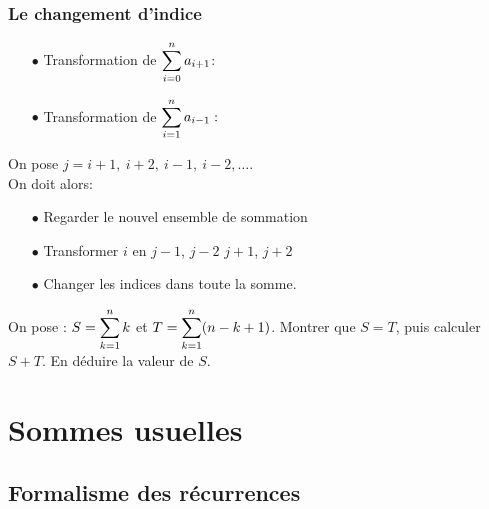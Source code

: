 \documentclass[a4paper, 11pt,reqno]{article}
\begin{document}
\subsubsection{Le changement d'indice}


\begin{exemples}
\begin{itemize}
\item[$\bullet$] Transformation de $\displaystyle\sum\limits_{i=0}^{n} a_{i+1}$:\\
\vspace{1cm}


\item[$\bullet$] Transformation de $\displaystyle \sum\limits_{i=1}^{n} a_{i-1}:$\\
\vspace{1cm}

\end{itemize}
\end{exemples}




On pose $j=i+1,\ i+2,\ i-1,\ i-2,\dots$.\\ On doit alors:
\begin{itemize}
\item[$\bullet$] Regarder le nouvel ensemble de sommation
\item[$\bullet$]  Transformer $i$ en $j-1 $, $j-2$ $j+1$, $j+2$
\item[$\bullet$] Changer les indices dans toute la somme. 
\end{itemize}





{\footnotesize 
\begin{exercice}
On pose : $\displaystyle S = \sum\limits_{k=1}^n k$ et $\displaystyle T = \sum\limits_{k=1}^n (n-k+1)$. Montrer que $S=T$, puis calculer $S+T$. En d\'eduire la valeur de $S$.
\end{exercice}}


\section{Sommes usuelles}

\subsection{Formalisme des récurrences}
\end{document}
